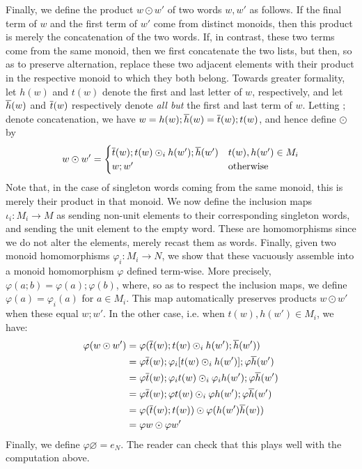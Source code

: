 Finally, we define the product $w\odot w'$ of two words $w,w'$ as follows. If the final term of $w$ and the first term of $w'$ come from distinct monoids, then this product is merely the concatenation of the two words. If, in contrast, these two terms come from the same monoid, then we first concatenate the two lists, but then, so as to preserve alternation, replace these two adjacent elements with their product in the respective monoid to which they both belong. Towards greater formality, let $h(w)$ and $t(w)$ denote the first and last letter of $w$, respectively, and let $\overline{h}(w)$ and $\overline{t}(w)$ respectively denote \emph{all but} the first and last term of $w$. Letting $;$ denote concatenation, we have $w=h(w);\overline{h}(w)=\overline{t}(w);t(w)$, and hence define $\odot$ by
\[w\odot w'=\begin{cases} \overline{t}(w);t(w)\odot_i h(w');\overline{h}(w') & t(w),h(w')\in M_i \\ w;w' & \text{otherwise} \end{cases}\]
Note that, in the case of singleton words coming from the same monoid, this is merely their product in that monoid. We now define the inclusion maps $\iota_i:M_i\to M$ as sending non-unit elements to their corresponding singleton words, and sending the unit element to the empty word. These are homomorphisms since we do not alter the elements, merely recast them as words. Finally, given two monoid homomorphisms $\varphi_i:M_i\to N$, we show that these vacuously assemble into a monoid homomorphism $\varphi$ defined term-wise. More precisely, $\varphi(a;b)=\varphi(a);\varphi(b)$, where, so as to respect the inclusion maps, we define $\varphi(a)=\varphi_i(a)$ for $a\in M_i$. This map automatically preserves products $w\odot w'$ when these equal $w;w'$. In the other case, i.e. when $t(w),h(w')\in M_i$, we have:
\begin{align*}
    \varphi(w\odot w')&=\varphi(\overline{t}(w);t(w)\odot_i h(w');\overline{h}(w')) \\
    &=\varphi\overline{t}(w);\varphi_i[t(w)\odot_i h(w')];\varphi\overline{h}(w') \\
    &= \varphi\overline{t}(w);\varphi_it(w)\odot_i\varphi_i h(w');\varphi\overline{h}(w') \\
    &= \varphi\overline{t}(w);\varphi t(w)\odot_i\varphi h(w');\varphi\overline{h}(w') \\
    &= \varphi(\overline{t}(w);t(w))\odot \varphi(h(w')\overline{h}(w)) \\
    &= \varphi w\odot \varphi w'
\end{align*}
Finally, we define $\varphi\varnothing=e_N$. The reader can check that this plays well with the computation above.

